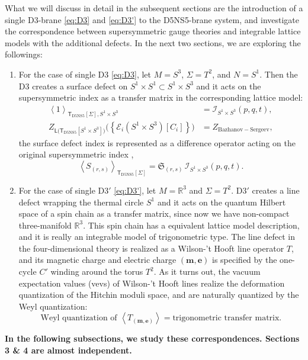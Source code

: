 What we will discuss in detail in the subsequent sections
are the introduction of a single D3-brane \eqref{eq:D3} and \eqref{eq:D3'} to the
D5NS5-brane system, and investigate the correspondence between supersymmetric gauge theories
and integrable lattice models with the additional
defects. In the next two sections, we are exploring the followings:
\begin{enumerate}
	\item For the case of single D3 \eqref{eq:D3}, let $M=S^{3}$, $\Sigma=T^{2}$, and $N=S^{1}$.
Then the D3 creates a surface defect on $S^{1}\times S^{1} \subset S^1\times S^3$ and it
acts on the supersymmetric index as a transfer matrix in the corresponding
lattice model:
\begin{align}
  \left\langle  1  \right\rangle_{\mathsf{T}_{\mathrm{D5NS5}}[\Sigma],S^{1}\times S^{3}}
    &  =  \mathcal{I}_{S^{1}\times S^{3}}(p,q,t),\\
  Z_{\mathsf{L}\big(\mathsf{T}_{\mathrm{D5NS5}}[S^{1}\times S^{3}]\big)}
    \big( \left\{ \mathcal{E}_{i}(S^{1}\times S^{3})[C_i]\right\} \big)
    &  =  Z_{\mathrm{Bazhanov-Sergeev}},
\end{align}
the surface defect index is represented as a difference operator
acting on the original supersymmetric index \cite{Gaiotto:2012xa,Gadde:2013dda},
\begin{equation}
  \left\langle S_{(r,s)}\right\rangle_{\mathsf{T}_{\mathrm{D5NS5}}[\Sigma]}
    =
      \mathfrak{S}_{(r,s)} \, \mathcal{I}_{S^{1}\times S^{3}}(p,q,t).
\end{equation}
\item For the case of single D3$'$ \eqref{eq:D3'}, let $M=\mathbb{R}^{3}$ and $\Sigma=T^{2}$.
D3$'$ creates a line defect wrapping the thermal circle $S^{1}$ and it acts on the quantum
Hilbert space of a spin chain as a transfer matrix, since now we have
non-compact three-manifold $\mathbb{R}^{3}$.
This spin chain has a equivalent lattice model description, and it is really an integrable model of
trigonometric type. The line defect in the
four-dimensional theory is realized as a Wilson-'t Hooft line operator
$T$, and its magnetic charge and electric charge $(\mathbf{m},\mathbf{e})$
is specified by the one-cycle $C'$ winding around the torus $T^{2}$. As it
turns out, the vacuum expectation values (vevs) of Wilson-'t Hooft
lines realize the deformation quantization of the Hitchin moduli space,
and are naturally quantized by the Weyl quantization:
\begin{equation}
  \textrm{Weyl quantization of }  \left\langle  T_{\left(\mathbf{m},\mathbf{e}\right)}  \right\rangle
  =  \textrm{trigonometric transfer matrix.}
\end{equation}
\end{enumerate}
%

{\bf In the following subsections, we study these correspondences.
Sections 3 \& 4 are almost independent.}

















